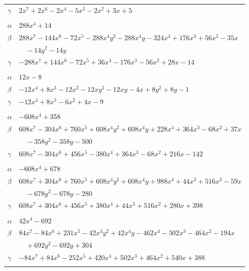 \documentclass[11pt]{article}
\begin{document}
\begin{longtable}{@{}ll@{}}
$\gamma$ & $2x^{7}+2x^{6}-2x^{4}-5x^{3}-2x^{2}+3x+5$\\
\addlinespace[3pt]
\multicolumn{2}{@{}l}{$\{i,j\}=\{4,34\}$, $k_{ij}=2\cdot 7$}\\
$\alpha$ & $288x^{4}+14$\\
$\beta$ & $288x^{7}-144x^{6}-72x^{5}-288x^{4}y^{2}-288x^{4}y-324x^{4}+176x^{3}+56x^{2}-35x$\\
 & $\quad -14y^{2}-14y$\\
$\gamma$ & $-288x^{7}+144x^{6}-72x^{5}+36x^{4}-176x^{3}-56x^{2}+28x-14$\\
\addlinespace[3pt]
\multicolumn{2}{@{}l}{$\{i,j\}=\{4,38\}$, $k_{ij}=1$}\\
$\alpha$ & $12x-8$\\
$\beta$ & $-12x^{4}+8x^{3}-12x^{2}-12xy^{2}-12xy-4x+8y^{2}+8y-1$\\
$\gamma$ & $-12x^{4}+8x^{3}-6x^{2}+4x-9$\\
\addlinespace[3pt]
\multicolumn{2}{@{}l}{$\{i,j\}=\{4,39\}$, $k_{ij}=2^{2}\cdot 5^{3}$}\\
$\alpha$ & $-608x^{4}+358$\\
$\beta$ & $608x^{7}-304x^{6}+760x^{5}+608x^{4}y^{2}+608x^{4}y+228x^{4}+364x^{3}-68x^{2}+37x$\\
 & $\quad -358y^{2}-358y-500$\\
$\gamma$ & $608x^{7}-304x^{6}+456x^{5}-380x^{4}+364x^{3}-68x^{2}+216x-142$\\
\addlinespace[3pt]
\multicolumn{2}{@{}l}{$\{i,j\}=\{4,40\}$, $k_{ij}=2^{3}\cdot 5\cdot 7$}\\
$\alpha$ & $-608x^{4}+678$\\
$\beta$ & $608x^{7}+304x^{6}+760x^{5}+608x^{4}y^{2}+608x^{4}y+988x^{4}+44x^{3}+516x^{2}-59x$\\
 & $\quad -678y^{2}-678y-280$\\
$\gamma$ & $608x^{7}+304x^{6}+456x^{5}+380x^{4}+44x^{3}+516x^{2}+280x+398$\\
\addlinespace[3pt]
\multicolumn{2}{@{}l}{$\{i,j\}=\{5,17\}$, $k_{ij}=2^{2}\cdot 5^{2}\cdot 13$}\\
$\alpha$ & $42x^{4}-692$\\
$\beta$ & $84x^{7}-84x^{6}+231x^{5}-42x^{4}y^{2}+42x^{4}y-462x^{4}-502x^{3}-464x^{2}-194x$\\
 & $\quad +692y^{2}-692y+304$\\
$\gamma$ & $-84x^{7}+84x^{6}-252x^{5}+420x^{4}+502x^{3}+464x^{2}+540x+388$\\
\addlinespace[3pt]
\multicolumn{2}{@{}l}{$\{i,j\}=\{5,18\}$, $k_{ij}=2\cdot 3^{2}\cdot 5^{4}$}\\

\end{longtable}
\end{document}
